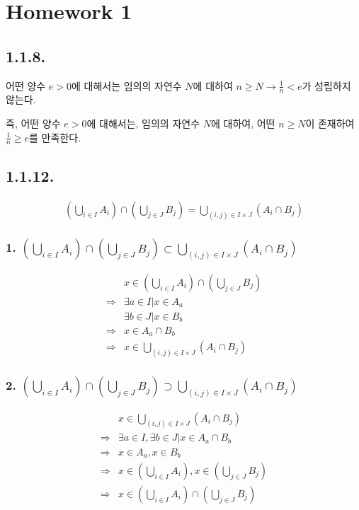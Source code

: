 \documentclass{article}
\begin{document}
\twocolumn



\section{Homework 1}

\subsection{1.1.8.}

어떤 양수 $e > 0$에 대해서는 임의의 자연수 $N$에 대하여 $n \geq N \rightarrow \frac{1}{n} < e$가 성립하지 않는다.

즉, 어떤 양수 $e > 0$에 대해서는, 임의의 자연수 $N$에 대하여, 어떤 $n \geq N$이 존재하여 $\frac{1}{n} \geq e$를 만족한다.

\subsection{1.1.12.}

\begin{align*}
\left(\bigcup_{i \in I} A_i \right) \cap \left(\bigcup_{j \in J} B_j \right) 
=
 \bigcup_{(i, j) \in I \times J} (A_i \cap B_j)
\end{align*}


\subsubsection{1. $\left(\bigcup_{i \in I} A_i \right) \cap \left(\bigcup_{j \in J} B_j \right) \subset \bigcup_{(i, j) \in I \times J} (A_i \cap B_j)$}
\begin{align*}
&x \in \left(\bigcup_{i \in I} A_i \right) \cap \left(\bigcup_{j \in J} B_j \right)
\\ \Rightarrow& \exists a \in I | x \in A_a
\\ & \exists b \in J | x \in B_b
\\ \Rightarrow& x \in A_a \cap B_b
\\ \Rightarrow& x \in \bigcup_{(i, j) \in I \times J} (A_i \cap B_j)
\end{align*}

\subsubsection{2. $\left(\bigcup_{i \in I} A_i \right) \cap \left(\bigcup_{j \in J} B_j \right) \supset \bigcup_{(i, j) \in I \times J} (A_i \cap B_j)$}
\begin{align*}
&x \in \bigcup_{(i, j) \in I \times J} (A_i \cap B_j) 
\\ \Rightarrow& \exists a \in I, \exists b \in J | x \in A_a \cap B_b 
\\ \Rightarrow&x \in A_a, x \in B_b 
\\ \Rightarrow&x \in \left(\bigcup_{i \in I} A_i \right), x \in \left(\bigcup_{j \in J} B_j \right)
\\ \Rightarrow&x \in \left(\bigcup_{i \in I} A_i \right) \cap \left(\bigcup_{j \in J} B_j \right)
\end{align*}
\end{document}
